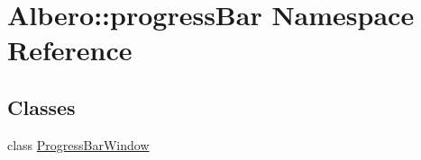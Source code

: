 \hypertarget{namespaceAlbero_1_1progressBar}{
\section{Albero::progressBar Namespace Reference}
\label{namespaceAlbero_1_1progressBar}
}
\subsection*{Classes}
\begin{DoxyCompactItemize}
\item 
class \hyperlink{classAlbero_1_1progressBar_1_1ProgressBarWindow}{ProgressBarWindow}
\end{DoxyCompactItemize}
